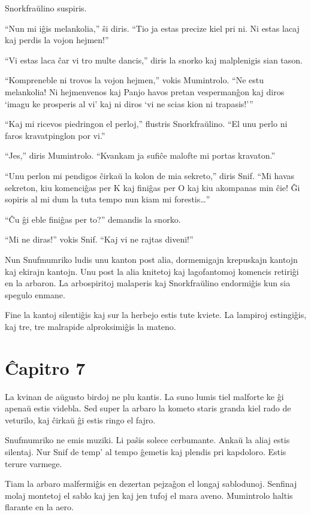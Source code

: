 Snorkfraŭlino suspiris.

``Nun mi iĝis melankolia,'' ŝi diris. ``Tio ja estas precize kiel pri ni. Ni estas lacaj kaj perdis la vojon hejmen!''

``Vi estas laca ĉar vi tro multe dancis,'' diris la snorko kaj malplenigis sian tason.

``Kompreneble ni trovos la vojon hejmen,'' vokis Mumintrolo. ``Ne estu melankolia! Ni hejmenvenos kaj Panjo havos pretan vespermanĝon kaj diros `imagu ke prosperis al vi' kaj ni diros `vi ne scias kion ni trapasis!'''

``Kaj mi ricevos piedringon el perloj,'' flustris Snorkfraŭlino. ``El unu perlo ni faros kravatpinglon por vi.''

``Jes,'' diris Mumintrolo. ``Kvankam ja sufiĉe malofte mi portas kravaton.''

``Unu perlon mi pendigos ĉirkaŭ la kolon de mia sekreto,'' diris Snif. ``Mi havas sekreton, kiu komenciĝas per K kaj finiĝas per O kaj kiu akompanas min ĉie! Ĝi sopiris al mi dum la tuta tempo nun kiam mi forestis{\ldots}''

``Ĉu ĝi eble finiĝas per to?'' demandis la snorko.

``Mi ne diras!'' vokis Snif. ``Kaj vi ne rajtas diveni!''

Nun Snufmumriko ludis unu kanton post alia, dormemigajn krepuskajn kantojn kaj ekirajn kantojn. Unu post la alia knitetoj kaj lagofantomoj komencis retiriĝi en la arbaron. La arbospiritoj malaperis kaj Snorkfraŭlino endormiĝis kun sia spegulo enmane.

Fine la kantoj silentiĝis kaj sur la herbejo estis tute kviete. La lampiroj estingiĝis, kaj tre, tre malrapide alproksimiĝis la mateno.

\chapter[Ĉapitro 7]{Ĉapitro 7}

La kvinan de aŭgusto birdoj ne plu kantis. La suno lumis tiel malforte ke ĝi apenaŭ estis videbla. Sed super la arbaro la kometo staris granda kiel rado de veturilo, kaj ĉirkaŭ ĝi estis ringo el fajro.

Snufmumriko ne emis muziki. Li paŝis solece cerbumante. Ankaŭ la aliaj estis silentaj. Nur Snif de temp' al tempo ĝemetis kaj plendis pri kapdoloro. Estis terure varmege.

Tiam la arbaro malfermiĝis en dezertan pejzaĝon el longaj sablodunoj. Senfinaj molaj montetoj el sablo kaj jen kaj jen tufoj el mara aveno. Mumintrolo haltis flarante en la aero.

